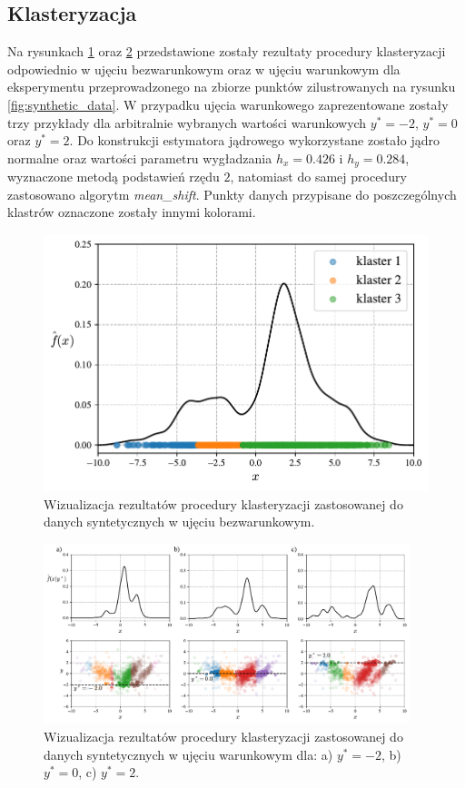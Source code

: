 \documentclass[12pt,a4paper,oneside]{book}
\theoremstyle{definition}
\begin{document}
\subsection*{Klasteryzacja}

Na rysunkach \ref{fig:kde_synthetic_data_clustering} oraz \ref{fig:ckde_synthetic_data_clustering} przedstawione zostały rezultaty procedury klasteryzacji odpowiednio w ujęciu bezwarunkowym oraz w ujęciu warunkowym dla eksperymentu przeprowadzonego na zbiorze punktów zilustrowanych na rysunku \ref{fig:synthetic_data}. W przypadku ujęcia warunkowego zaprezentowane zostały trzy przykłady dla arbitralnie wybranych wartości warunkowych $y^*=-2$, $y^*=0$ oraz $y^*=2$. Do konstrukcji estymatora jądrowego wykorzystane zostało jądro normalne oraz wartości parametru wygładzania $h_x=0.426$ i $h_y=0.284$, wyznaczone metodą podstawień rzędu $2$, natomiast do samej procedury zastosowano algorytm \textit{mean\_shift}. Punkty danych przypisane do poszczególnych klastrów oznaczone zostały innymi kolorami.
\begin{figure}[H]
    \centering
    \includegraphics[scale=0.65]{synthetic_data_clustering_kde}
    \vspace{-0.5cm} 
    \caption{Wizualizacja rezultatów procedury klasteryzacji zastosowanej do danych syntetycznych w ujęciu bezwarunkowym.}
    \label{fig:kde_synthetic_data_clustering}
\end{figure}
\begin{figure}[H]
    \centering
    \includegraphics[width=0.95\textwidth]{synthetic_data_clustering_ckde}
    \vspace{-0.5cm} 
    \caption{Wizualizacja rezultatów procedury klasteryzacji zastosowanej do danych syntetycznych w ujęciu warunkowym dla: a) $y^*=-2$, b) $y^*=0$, c) $y^*=2$.}
    \label{fig:ckde_synthetic_data_clustering}
\end{figure}
\end{document}
